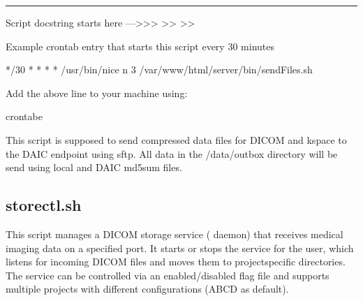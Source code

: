 \documentclass[letterpaper,10pt,english]{sphinxmanual}
\begin{document}
\bigskip\hrule\bigskip


\sphinxAtStartPar
Script docstring starts here —\textgreater{}\textgreater{}\textgreater{}
\textendash{}\textgreater{}\textgreater{}
\textendash{}\textgreater{}\textgreater{}

\sphinxAtStartPar
Example crontab entry that starts this script every 30 minutes

\begin{sphinxVerbatim}[commandchars=\\\{\}]
*/30 * * * * /usr/bin/nice \PYGZhy{}n 3 /var/www/html/server/bin/sendFiles.sh
\end{sphinxVerbatim}

\sphinxAtStartPar
Add the above line to your machine using:

\begin{sphinxVerbatim}[commandchars=\\\{\}]
\PYGZgt{}crontab\PYGZhy{}e
\end{sphinxVerbatim}

\sphinxAtStartPar
This script is supposed to send compressed data files for DICOM and k\sphinxhyphen{}space to the DAIC endpoint using sftp. All data in the /data/outbox directory will be send using local and DAIC md5sum files.

\sphinxstepscope


\subsection{storectl.sh}
\label{\detokenize{Architecture/scripts/storectl:storectl-sh}}\label{\detokenize{Architecture/scripts/storectl::doc}}
\sphinxAtStartPar
This script manages a DICOM storage service ( daemon) that receives medical imaging data on a specified port. It starts or stops the  service for the   user, which listens for incoming DICOM files and moves them to project\sphinxhyphen{}specific directories. The service can be controlled via an enabled/disabled flag file and supports multiple projects with different configurations (ABCD as default).

\sphinxAtStartPar
{}


\sphinxAtStartPar
{}
\end{document}
